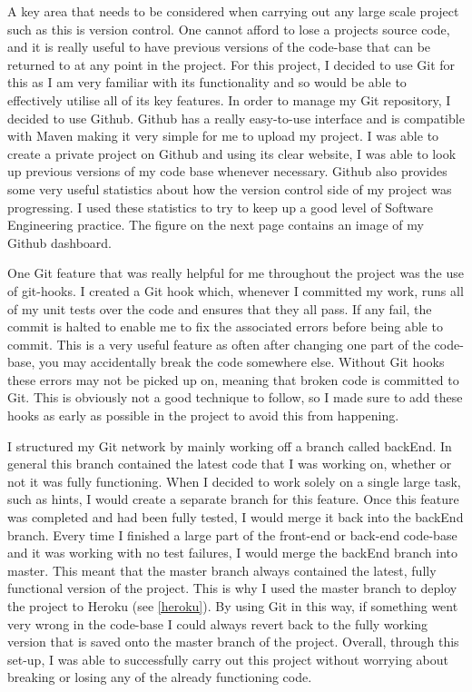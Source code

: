 A key area that needs to be considered when carrying out any large scale project such as this is version control. One cannot afford to lose a projects source code, and it is really useful to have previous versions of the code-base that can be returned to at any point in the project. For this project, I decided to use Git for this as I am very familiar with its functionality and so would be able to effectively utilise all of its key features. In order to manage my Git repository, I decided to use Github. Github has a really easy-to-use interface and is compatible with Maven making it very simple for me to upload my project. I was able to create a private project on Github and using its clear website, I was able to look up previous versions of my code base whenever necessary. Github also provides some very useful statistics about how the version control side of my project was progressing. I used these statistics to try to keep up a good level of Software Engineering practice. The figure on the next page contains an image of my Github dashboard.

One Git feature that was really helpful for me throughout the project was the use of git-hooks. I created a Git hook which, whenever I committed my work, runs all of my unit tests over the code and ensures that they all pass. If any fail, the commit is halted to enable me to fix the associated errors before being able to commit. This is a very useful feature as often after changing one part of the code-base, you may accidentally break the code somewhere else. Without Git hooks these errors may not be picked up on, meaning that broken code is committed to Git.  This is obviously not a good technique to follow, so I made sure to add these hooks as early as possible in the project to avoid this from happening.

I structured my Git network by mainly working off a branch called backEnd. In general this branch contained the latest code that I was working on, whether or not it was fully functioning. When I decided to work solely on a single large task, such as hints, I would create a separate branch for this feature. Once this feature was completed and had been fully tested, I would merge it back into the backEnd branch. Every time I finished a large part of the front-end or back-end code-base and it was working with no test failures, I would merge the backEnd branch into master. This meant that the master branch always contained the latest, fully functional version of the project. This is why I used the master branch to deploy the project to Heroku (see \ref{heroku}). By using Git in this way,  if something went very wrong in the code-base I could always revert back to the fully working version that is saved onto the master branch of the project. Overall, through this set-up, I was able to successfully carry out this project without worrying about breaking or losing any of the already functioning code.


